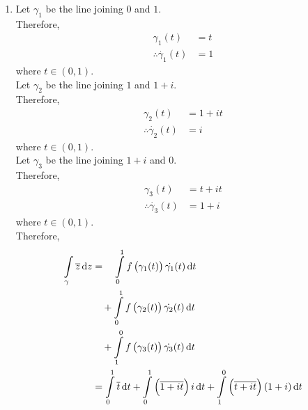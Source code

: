 \documentclass[fleqn, a4paper, 11pt, oneside]{amsart}
\theoremstyle{definition}
\theoremstyle{theorem}
\begin{document}
\begin{solution}
	\begin{enumerate}[leftmargin=*]
		\setcounter{enumi}{0}
		\item
			Let $\gamma_1$ be the line joining $0$ and $1$.\\
			Therefore,
			\begin{align*}
				\gamma_1(t)                  & = t \\
				\therefore \dot{\gamma_1}(t) & = 1
			\end{align*}
			where $t \in (0,1)$.\\
			Let $\gamma_2$ be the line joining $1$ and $1 + i$.\\
			Therefore,
			\begin{align*}
				\gamma_2(t)                  & = 1 + i t \\
				\therefore \dot{\gamma_2}(t) & = i
			\end{align*}
			where $t \in (0,1)$.\\
			Let $\gamma_3$ be the line joining $1 + i$ and $0$.\\
			Therefore,
			\begin{align*}
				\gamma_3(t)                  & = t + i t \\
				\therefore \dot{\gamma_3}(t) & = 1 + i
			\end{align*}
			where $t \in (0,1)$.\\
			Therefore,
			\begin{align*}
				\int\limits_{\gamma} \overline{z} \dif z & = \quad \int\limits_{0}^{1} f\left( \gamma_1(t) \right) \dot{\gamma_1}(t) \dif t                                                                                                  \\
                                                                         & \quad + \int\limits_{0}^{1} f\left( \gamma_2(t) \right) \dot{\gamma_2}(t) \dif t                                                                                                  \\
                                                                         & \quad + \int\limits_{1}^{0} f\left( \gamma_3(t) \right) \dot{\gamma_3}(t) \dif t                                                                                                  \\
                                                                         & = \int\limits_{0}^{1} \overline{t} \dif t + \int\limits_{0}^{1} \left( \overline{1 + i t} \right) i \dif t + \int\limits_{1}^{0} \left( \overline{t + i t} \right) (1 + i) \dif t \\

\end{align*}
\end{enumerate}
\end{solution}
\end{document}
